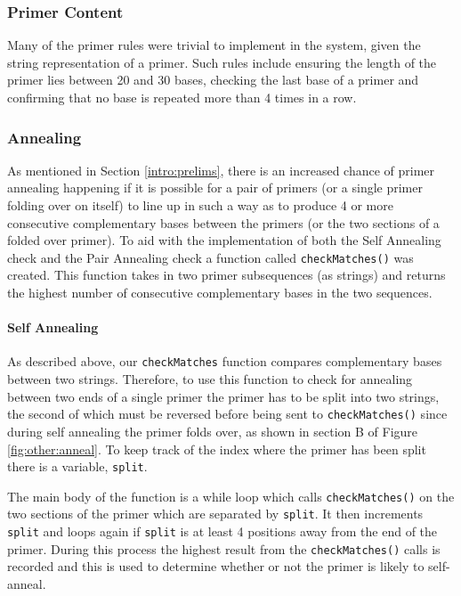 \subsubsection{Primer Content}
Many of the primer rules were trivial to implement in the system, given
the string representation of a primer. Such rules include ensuring the
length of the primer lies between 20 and 30 bases, checking the last base
of a primer and confirming that no base is repeated more than 4 times
in a row. 

\subsubsection{Annealing}

As mentioned in Section \ref{intro:prelims}, there is an increased
chance of primer annealing happening if it is possible for a pair of
primers (or a single primer folding over on itself) to line up in such a
way as to produce 4 or more consecutive complementary bases between the
primers (or the two sections of a folded over primer). To aid with the
implementation of both the Self Annealing check and the Pair Annealing
check a function called \texttt{checkMatches()} was created. This function
takes in two primer subsequences (as strings) and returns the highest 
number of consecutive complementary bases in the two sequences.

\paragraph{Self Annealing}

As described above, our \texttt{checkMatches} function compares
complementary bases between two strings. Therefore, to use this function
to check for annealing between two ends of a single primer the primer
has to be split into two strings, the second of which must be reversed
before being sent to \texttt{checkMatches()} since during self annealing
the primer folds over, as shown in section B of Figure 
\ref{fig:other:anneal}. To keep track of the index where the primer has
been split there is a variable, \texttt{split}.

The main body of the function is a while loop which calls
\texttt{checkMatches()} on the two sections of the primer which are
separated by \texttt{split}. 
It then increments \texttt{split} and loops again if \texttt{split} is
at least 4 positions away from the end of the primer.
During this process the highest result from the
\texttt{checkMatches()} calls is recorded and this is used to
determine whether or not the primer is likely to self-anneal.

